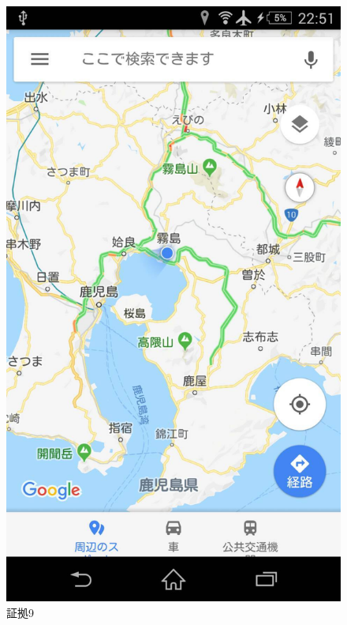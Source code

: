 \begin{figure}[H]
  \centering
  \includegraphics[clip,scale=0.2]{./section/Taira/figures/fig9}
  \caption{証拠9}
\label{fig9}
\end{figure}


